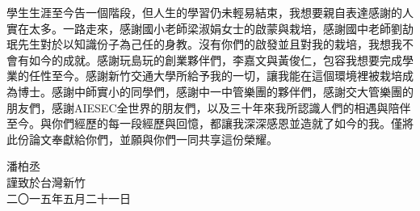 學生生涯至今告一個階段，但人生的學習仍未輕易結束，我想要親自表達感謝的人實在太多。一路走來，感謝國小老師梁淑娟女士的啟蒙與栽培，感謝國中老師劉劼珉先生對於以知識份子為己任的身教。沒有你們的啟發並且對我的栽培，我想我不會有如今的成就。感謝玩島玩的創業夥伴們，李嘉文與黃俊仁，包容我想要完成學業的任性至今。感謝新竹交通大學所給予我的一切，讓我能在這個環境裡被栽培成為博士。感謝中師實小的同學們，感謝中一中管樂團的夥伴們，感謝交大管樂團的朋友們，感謝AIESEC全世界的朋友們，以及三十年來我所認識人們的相遇與陪伴至今。與你們經歷的每一段經歷與回憶，都讓我深深感恩並造就了如今的我。僅將此份論文奉獻給你們，並願與你們一同共享這份榮耀。

\hspace{3em}

\begin{flushright}

潘柏丞\\
謹致\;\;於台灣新竹\\
二〇一五年五月二十一日
\end{flushright}




